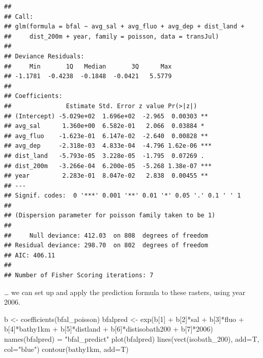 \documentclass[
]{book}
\newenvironment{Shaded}{\begin{snugshade}}{\end{snugshade}}
\newcommand{\AttributeTok}[1]{\textcolor[rgb]{0.61,0.61,0.61}{#1}}
\newcommand{\DecValTok}[1]{\textcolor[rgb]{0.06,0.06,0.06}{#1}}
\newcommand{\FunctionTok}[1]{\textcolor[rgb]{0,0,0}{#1}}
\newcommand{\NormalTok}[1]{#1}
\newcommand{\OtherTok}[1]{\textcolor[rgb]{0.37,0.37,0.37}{#1}}
\newcommand{\SpecialCharTok}[1]{\textcolor[rgb]{0,0,0}{#1}}
\newcommand{\StringTok}[1]{\textcolor[rgb]{0.5,0.5,0.5}{#1}}
\begin{document}
\begin{verbatim}
## 
## Call:
## glm(formula = bfal ~ avg_sal + avg_fluo + avg_dep + dist_land + 
##     dist_200m + year, family = poisson, data = transJul)
## 
## Deviance Residuals: 
##     Min       1Q   Median       3Q      Max  
## -1.1781  -0.4238  -0.1848  -0.0421   5.5779  
## 
## Coefficients:
##               Estimate Std. Error z value Pr(>|z|)    
## (Intercept) -5.029e+02  1.696e+02  -2.965  0.00303 ** 
## avg_sal      1.360e+00  6.582e-01   2.066  0.03884 *  
## avg_fluo    -1.623e-01  6.147e-02  -2.640  0.00828 ** 
## avg_dep     -2.318e-03  4.833e-04  -4.796 1.62e-06 ***
## dist_land   -5.793e-05  3.228e-05  -1.795  0.07269 .  
## dist_200m   -3.266e-04  6.200e-05  -5.268 1.38e-07 ***
## year         2.283e-01  8.047e-02   2.838  0.00455 ** 
## ---
## Signif. codes:  0 '***' 0.001 '**' 0.01 '*' 0.05 '.' 0.1 ' ' 1
## 
## (Dispersion parameter for poisson family taken to be 1)
## 
##     Null deviance: 412.03  on 808  degrees of freedom
## Residual deviance: 298.70  on 802  degrees of freedom
## AIC: 406.11
## 
## Number of Fisher Scoring iterations: 7
\end{verbatim}

\ldots{} we can set up and apply the prediction formula to these rasters, using year 2006.

\begin{Shaded}
\begin{Highlighting}[]
\NormalTok{b }\OtherTok{\textless{}{-}} \FunctionTok{coefficients}\NormalTok{(bfal\_poisson)}
\NormalTok{bfalpred }\OtherTok{\textless{}{-}} \FunctionTok{exp}\NormalTok{(b[}\DecValTok{1}\NormalTok{] }\SpecialCharTok{+}\NormalTok{ b[}\DecValTok{2}\NormalTok{]}\SpecialCharTok{*}\NormalTok{sal }\SpecialCharTok{+}\NormalTok{ b[}\DecValTok{3}\NormalTok{]}\SpecialCharTok{*}\NormalTok{fluo }\SpecialCharTok{+}\NormalTok{ b[}\DecValTok{4}\NormalTok{]}\SpecialCharTok{*}\NormalTok{bathy1km }\SpecialCharTok{+}\NormalTok{ b[}\DecValTok{5}\NormalTok{]}\SpecialCharTok{*}\NormalTok{distland }\SpecialCharTok{+}\NormalTok{ b[}\DecValTok{6}\NormalTok{]}\SpecialCharTok{*}\NormalTok{distisobath200 }\SpecialCharTok{+}\NormalTok{ b[}\DecValTok{7}\NormalTok{]}\SpecialCharTok{*}\DecValTok{2006}\NormalTok{)}
\FunctionTok{names}\NormalTok{(bfalpred) }\OtherTok{=} \StringTok{"bfal\_predict"}
\FunctionTok{plot}\NormalTok{(bfalpred)}
\FunctionTok{lines}\NormalTok{(}\FunctionTok{vect}\NormalTok{(isobath\_200), }\AttributeTok{add=}\NormalTok{T, }\AttributeTok{col=}\StringTok{"blue"}\NormalTok{)}
\FunctionTok{contour}\NormalTok{(bathy1km, }\AttributeTok{add=}\NormalTok{T)}
\end{Highlighting}
\end{Shaded}
\end{document}
